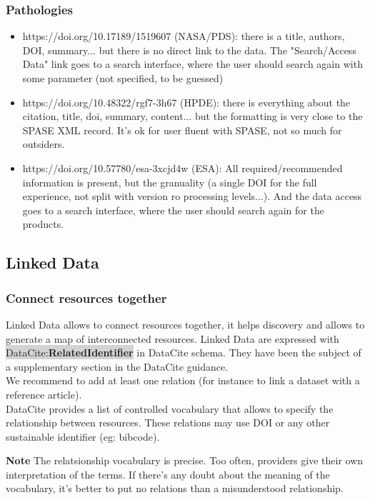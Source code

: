 \documentclass[11pt,a4paper]{ivoa}
\newcommand{\dataciteterm}[1]{\colorbox{lightgray}{DataCite:\textbf{#1}}}
\newcommand{\important}[1]{
	\begin{bigdescription}
		\item \color{ivoacolor}\textbf{Note} #1
	\end{bigdescription}
}
\begin{document}
\subsubsection{Pathologies}
\begin{itemize}
    \item https://doi.org/10.17189/1519607 (NASA/PDS): there is a title, authors, DOI, summary... but there is no direct link to the data. The "Search/Access Data" link goes to a search interface, where the user should search again with some parameter (not specified, to be guessed)
    \item https://doi.org/10.48322/rgf7-3h67 (HPDE): there is everything about the citation, title, doi, summary, content... but the formatting is very close to the SPASE XML record. It's ok for user fluent with SPASE, not so much for outsiders.
    \item https://doi.org/10.57780/esa-3xcjd4w (ESA): All required/recommended information is present, but the granuality (a single DOI for the full experience, not split with version ro processing levels...). And the data access goes to a search interface, where the user should search again for the products.
\end{itemize}


\subsection{Linked Data}
\label{sec:linkeddata}
\subsubsection{Connect resources together}
Linked Data allows to connect resources together, it helps discovery and allows to generate a map of interconnected resources. 
Linked Data are expressed with \dataciteterm{RelatedIdentifier} in DataCite schema. They have been the subject of a supplementary section in the DataCite guidance.\\

We recommend to add at least one relation (for instance to link a dataset with a reference article).\\


DataCite provides a list of controlled vocabulary that allows to specify the relationship between resources.
These relations may use DOI or any other sustainable identifier (eg: bibcode).

\important{	
The relatsionship vocabulary is precise.
Too often, providers give their own interpretation of the terms.
If there's any doubt about the meaning of the vocabulary,
it's better to put no relations than a misunderstood relationship.
}
\end{document}
